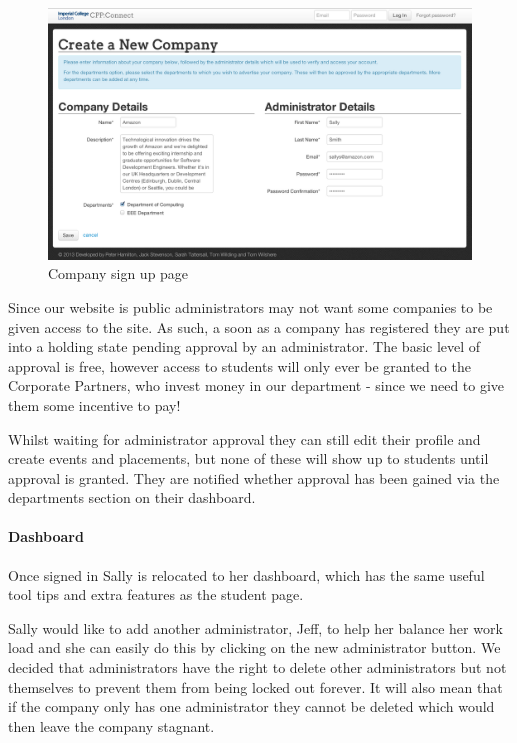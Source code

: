     \begin{figure}[H]\centering
    \includegraphics[scale=0.3]{images/user_experiences/company/amazon_signup}
    \caption{Company sign up page}
    \end{figure}

    Since our website is public administrators may not want some companies to be given access to the site. As such, a soon as a company has registered they are put into a holding state pending approval by an administrator.
    The basic level of approval is free, however access to students will only ever be granted to the Corporate Partners, who invest money in our department - since we need to give them some incentive to pay!

    Whilst waiting for administrator approval they can still edit their profile and create events and placements, but none of these will show up to students until approval is granted. They are notified whether approval has been gained via the departments section on their dashboard.

  \paragraph{Dashboard}
    Once signed in Sally is relocated to her dashboard, which has the same useful tool tips and extra features as the student page.

    Sally would like to add another administrator, Jeff, to help her balance her work load and she can easily do this by clicking on the new administrator button. We decided that administrators have the right to delete other administrators but not themselves to prevent them from being locked out forever. It will also mean that if the company only has one administrator they cannot be deleted which would then leave the company stagnant.

